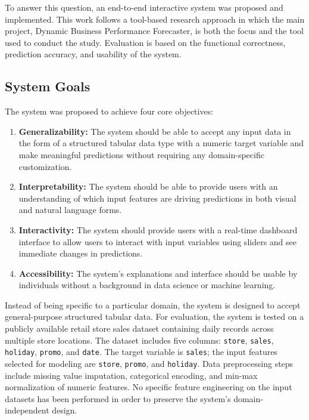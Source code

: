 \documentclass[12pt]{article}
\begin{document}
To answer this question, an end-to-end interactive system was proposed and implemented. This work follows a tool-based research approach in which the main project, Dynamic Business Performance Forecaster, is both the focus and the tool used to conduct the study. Evaluation is based on the functional correctness, prediction accuracy, and usability of the system.

\subsection{System Goals}
The system was proposed to achieve four core objectives:
\begin{enumerate}
  \item \textbf{Generalizability:} The system should be able to accept any input data in the form of a structured tabular data type with a numeric target variable and make meaningful predictions without requiring any domain-specific customization.
  \item \textbf{Interpretability:} The system should be able to provide users with an understanding of which input features are driving predictions in both visual and natural language forms.
  \item \textbf{Interactivity:} The system should provide users with a real-time dashboard interface to allow users to interact with input variables using sliders and see immediate changes in predictions.
  \item \textbf{Accessibility:} The system’s explanations and interface should be usable by individuals without a background in data science or machine learning.
\end{enumerate}

Instead of being specific to a particular domain, the system is designed to accept general-purpose structured tabular data. For evaluation, the system is tested on a publicly available
retail store sales dataset containing daily records across multiple store locations. The dataset
includes five columns: \texttt{store}, \texttt{sales}, \texttt{holiday}, \texttt{promo},
and \texttt{date}. The target variable is \texttt{sales}; the input features selected for
modeling are \texttt{store}, \texttt{promo}, and \texttt{holiday}. Data preprocessing steps
include missing value imputation, categorical encoding, and min-max normalization of
numeric features. No specific feature engineering on the input datasets
has been performed in order to preserve the system’s domain-independent design.
\end{document}

